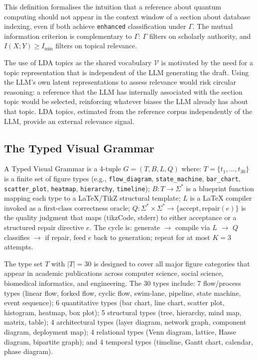 This definition formalises the intuition that a reference about quantum computing
should not appear in the context window of a section about database indexing, even if
both achieve \texttt{enhanced} classification under $\Gamma$.
The mutual information criterion is complementary to $\Gamma$: $\Gamma$ filters on
scholarly authority, and $I(X;Y)\geq I_{\min}$ filters on topical relevance.

The use of LDA topics as the shared vocabulary $\mathcal{V}$ is motivated by the
need for a topic representation that is independent of the LLM generating the draft.
Using the LLM's own latent representations to assess relevance would risk circular
reasoning: a reference that the LLM has internally associated with the section topic
would be selected, reinforcing whatever biases the LLM already has about that topic.
LDA topics, estimated from the reference corpus independently of the LLM, provide
an external relevance signal.

\subsection{The Typed Visual Grammar}

\begin{definition}
\label{def:tvg}
A Typed Visual Grammar is a 4-tuple $G=(T,B,L,Q)$ where:
$T=\{t_1,\ldots,t_{30}\}$ is a finite set of figure types
(e.g., \texttt{flow\_diagram}, \texttt{state\_machine}, \texttt{bar\_chart},
\texttt{scatter\_plot}, \texttt{heatmap}, \texttt{hierarchy}, \texttt{timeline});
$B: T\to\Sigma^*$ is a blueprint function mapping each type to a \LaTeX{}/TikZ
structural template;
$L$ is a \LaTeX{} compiler invoked as a first-class correctness oracle;
$Q: \Sigma^*\times\Sigma^*\to\{\mathrm{accept},\mathrm{repair}(e)\}$
is the quality judgment that maps (tikzCode, stderr) to either acceptance or a
structured repair directive $e$.
The \tvg{} cycle is: generate $\to$ compile via $L$ $\to$ $Q$ classifies
$\to$ if repair, feed $e$ back to generation; repeat for at most $K=3$ attempts.
\end{definition}

The type set $T$ with $|T|=30$ is designed to cover all major figure categories
that appear in academic publications across computer science, social science,
biomedical informatics, and engineering.
The 30 types include: 7 flow/process types (linear flow, forked flow, cyclic flow,
swim-lane, pipeline, state machine, event sequence); 6 quantitative types
(bar chart, line chart, scatter plot, histogram, heatmap, box plot);
5 structural types (tree, hierarchy, mind map, matrix, table);
4 architectural types (layer diagram, network graph, component diagram, deployment map);
4 relational types (Venn diagram, lattice, Hasse diagram, bipartite graph);
and 4 temporal types (timeline, Gantt chart, calendar, phase diagram).


